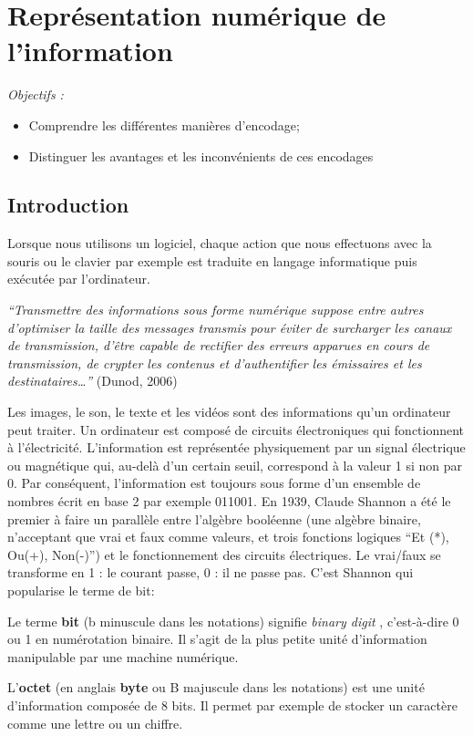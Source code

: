 \documentclass[11pt, a4paper]{book}
\begin{document}
\chapter{Représentation numérique de l’information}

{\it Objectifs :}
\begin{itemize}
\item Comprendre les différentes manières d'encodage;
\item Distinguer les avantages et les inconvénients de ces encodages

\end{itemize}

\section{Introduction}

Lorsque nous utilisons un logiciel, chaque action que nous effectuons avec la souris ou le clavier par exemple est traduite en langage informatique puis exécutée par l’ordinateur. 

{\it “Transmettre des informations sous forme numérique suppose entre autres d'optimiser la taille des messages transmis pour éviter de surcharger les canaux de transmission, d'être capable de rectifier des erreurs apparues en cours de transmission, de crypter les contenus et d'authentifier les émissaires et les destinataires…” }(Dunod, 2006)

Les images, le son, le texte et les vidéos sont des informations qu’un ordinateur peut traiter. Un ordinateur est composé de circuits électroniques qui fonctionnent à l'électricité. L’information est représentée physiquement par un signal électrique ou magnétique qui, au-delà d'un certain seuil, correspond à la valeur 1 si non par 0. Par conséquent, l’information est toujours sous forme d’un ensemble de nombres écrit en base 2 par exemple 011001.
En 1939, Claude Shannon a été le premier à faire un parallèle entre l'algèbre booléenne (une algèbre binaire, n'acceptant que vrai et faux comme valeurs, et trois fonctions logiques “Et (*), Ou(+), Non(-)”) et le fonctionnement des circuits électriques. Le vrai/faux se transforme en 1 : le courant passe, 0 : il ne passe pas. C'est Shannon qui popularise le terme de bit:

\begin{defi}
Le terme {\bf bit} (b minuscule dans les notations) signifie {\it binary digit }, c'est-à-dire 0 ou 1 en numérotation binaire. Il s'agit de la plus petite unité d'information manipulable par une machine numérique. 


L'{\bf octet} (en anglais {\bf byte} ou B majuscule dans les notations) est une unité d'information composée de 8 bits. Il permet par exemple de stocker un caractère comme une lettre ou un chiffre.
\end{defi}
\end{document}
